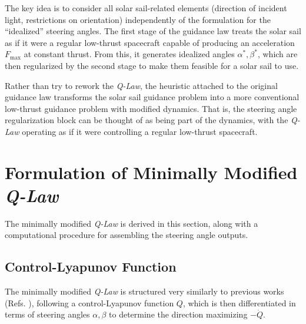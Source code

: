 The key idea is to consider all solar sail-related elements (direction of incident light, restrictions on orientation) independently of the formulation for the ``idealized'' steering angles. The first stage of the guidance law treats the solar sail as if it were a regular low-thrust spacecraft capable of producing an acceleration $F_{\max}$ at constant thrust. From this, it generates idealized angles $\alpha^*, \beta^*$, which are then regularized by the second stage to make them feasible for a solar sail to use.

Rather than try to rework the \textit{\textit{Q-Law}}, the heuristic attached to the original guidance law transforms the solar sail guidance problem into a more conventional low-thrust guidance problem with modified dynamics. That is, the steering angle regularization block can be thought of as being part of the dynamics, with the \textit{\textit{Q-Law}} operating as if it were controlling a regular low-thrust spacecraft.

\section{Formulation of Minimally Modified \textit{Q-Law}}
The minimally modified \textit{\textit{Q-Law}} is derived in this section, along with a computational procedure for assembling the steering angle outputs.

\subsection{Control-Lyapunov Function}
The minimally modified \textit{\textit{Q-Law}} is structured very similarly to previous works (Refs. \cite{petropoulos2004low, vargaperez2016, sanjeev2023}), following a control-Lyapunov function $Q$, which is then differentiated in terms of steering angles $\alpha, \beta$ to determine the direction maximizing $-\dot{Q}$.

